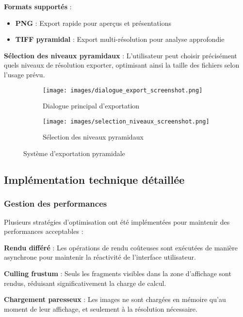 \documentclass[12pt,a4paper]{report}
\begin{document}
\textbf{Formats supportés} :
\begin{itemize}
\item \textbf{PNG} : Export rapide pour aperçus et présentations
\item \textbf{TIFF pyramidal} : Export multi-résolution pour analyse approfondie
\end{itemize}

\textbf{Sélection des niveaux pyramidaux} : L'utilisateur peut choisir précisément quels niveaux de résolution exporter, optimisant ainsi la taille des fichiers selon l'usage prévu.

\begin{figure}[H]
\centering
\begin{subfigure}{0.48\textwidth}
\texttt{[image: images/dialogue\_export\_screenshot.png]}
\caption{Dialogue principal d'exportation}
\end{subfigure}
\hfill
\begin{subfigure}{0.48\textwidth}
\texttt{[image: images/selection\_niveaux\_screenshot.png]}
\caption{Sélection des niveaux pyramidaux}
\end{subfigure}
\caption{Système d'exportation pyramidale}
\label{fig:export_pyramidal}
\end{figure}

\subsection{Implémentation technique détaillée}

\subsubsection{Gestion des performances}

Plusieurs stratégies d'optimisation ont été implémentées pour maintenir des performances acceptables :

\textbf{Rendu différé} : Les opérations de rendu coûteuses sont exécutées de manière asynchrone pour maintenir la réactivité de l'interface utilisateur.

\textbf{Culling frustum} : Seuls les fragments visibles dans la zone d'affichage sont rendus, réduisant significativement la charge de calcul.

\textbf{Chargement paresseux} : Les images ne sont chargées en mémoire qu'au moment de leur affichage, et seulement à la résolution nécessaire.
\end{document}
